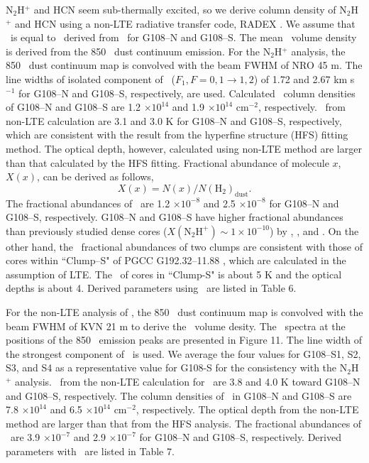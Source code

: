 \documentclass[manuscript]{aastex}
\begin{document}
N$_{2}$H$^{+}$ and HCN seem sub-thermally excited, so we derive column density of N$_{2}$H$^{+}$ and HCN using a non-LTE radiative transfer code, RADEX \citep{vandertak07}.
We assume that \tkin\ is equal to \tex\ derived from \ceot\ for G108--N and G108--S.
The mean \atomh\ volume density is derived from the 850 \m\ dust continuum emission.
For the N$_{2}$H$^{+}$ analysis, the 850 \m\ dust continuum map is convolved with the beam FWHM of NRO 45 m.
The line widths of isolated component of \nhp\ ($F_{1}, F=0,1 \rightarrow 1,2$) of 1.72 and 2.67 km s$^{-1}$ for G108--N and G108--S, respectively, are used.
Calculated \nhp\ column densities of G108--N and G108--S are 1.2 $\times 10^{14}$ and 1.9 $\times 10^{14}$ cm$^{-2}$, respectively.
\tex\ from non-LTE calculation are 3.1 and 3.0 K for G108--N and G108--S, respectively, which are consistent with the result from the hyperfine structure (HFS) fitting method.
The optical depth, however, calculated using non-LTE method are larger than that calculated by the HFS fitting.
Fractional abundance of molecule $x$, $X(x)$, can be derived as follows,
\begin{equation}
X(x) = N(x) / N(\textrm{H}_{2})_\textrm{dust}.
\end{equation}
The fractional abundances of \nhp\ are 1.2 $\times 10^{-8}$ and 2.5 $\times 10^{-8}$ for G108--N and G108--S, respectively.
G108--N and G108--S have higher fractional abundances than previously studied dense cores ($X(\textrm{N}_{2}\textrm{H}^{+}) \sim 1 \times 10^{-10}$) by \citet{caselli02}, \citet{tafalla02}, and \citet{di04}.
On the other hand, the \nhp\ fractional abundances of two clumps are consistent with those of cores within ``Clump--S" of PGCC G192.32--11.88 \citep{liu16}, which are calculated in the assumption of LTE.
The \tex\ of cores in ``Clump-S" is about 5 K and the optical depths is about 4.
Derived parameters using \nhp\ are listed in Table 6.


For the non-LTE analysis of \hcn, the 850 \m\ dust continuum map is convolved with the beam FWHM of KVN 21 m to derive the \atomh\ volume desity.
The \hcn\ spectra at the positions of the 850 \m\ emission peaks are presented in Figure 11.
The line width of the strongest component of \hcn\ is used.
We average the four values for G108--S1, S2, S3, and S4 as a representative value for G108-S for the consistency with the N$_{2}$H$^{+}$ analysis.
\tex\ from the non-LTE calculation for \hcn\ are 3.8 and 4.0 K toward G108--N and G108--S, respectively.
The column densities of \hcn\ in G108--N and G108--S are 7.8 $\times 10^{14}$ and 6.5 $\times 10^{14}$ cm$^{-2}$, respectively.
The optical depth from the non-LTE method are larger than that from the HFS analysis.
The fractional abundances of \hcn\ are 3.9 $\times 10^{-7}$ and 2.9 $\times 10^{-7}$ for G108--N and G108--S, respectively.
Derived parameters with \hcn\ are listed in Table 7.
\end{document}
